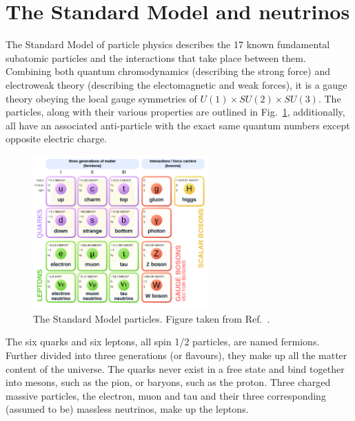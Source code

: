 \section{The Standard Model and neutrinos}
\label{sec:theory_sm}

The Standard Model of particle physics describes the 17 known fundamental subatomic particles and
the interactions that take place between them. Combining both quantum chromodynamics (describing
the strong force) and electroweak theory (describing the electomagnetic and weak forces), it is a
gauge theory obeying the local gauge symmetries of $U(1) \times SU(2) \times SU(3)$. The particles,
along with their various properties are outlined in Fig.~\ref{fig:sm}, additionally, all have an
associated anti-particle with the exact same quantum numbers except opposite electric charge.

\begin{figure} %
    \includegraphics[origin=c,width=0.6\textwidth]{diagrams/3-theory/sm.png}
    \caption[The Standard Model particles]
    {The Standard Model particles. Figure taken from Ref.~\cite{wiki2020}.}
    \label{fig:sm}
\end{figure} %

The six quarks and six leptons, all spin 1/2 particles, are named fermions. Further divided into
three generations (or flavours), they make up all the matter content of the universe. The quarks
never exist in a free state and bind together into mesons, such as the pion, or baryons, such as
the proton. Three charged massive particles, the electron, muon and tau and their three
corresponding (assumed to be) massless neutrinos, make up the leptons.

